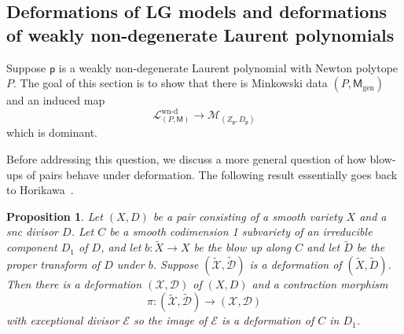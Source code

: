 \documentclass[10pt]{amsart}
\numberwithin{equation}{section}
\theoremstyle{plain}
\newtheorem{proposition}[theorem]{Proposition}
\theoremstyle{definition}
\theoremstyle{remark}
\DeclareMathOperator{\gen}{gen}
\begin{document}
\subsection{Deformations of LG models and deformations of weakly non-degenerate Laurent polynomials}\label{subsection:LG-deformations}

Suppose \(\mathsf{p}\) is a weakly non-degenerate Laurent polynomial with Newton polytope \(P\). The goal of this section is to show that there is Minkowski data \((P,\mathsf{M}_{\gen})\) and an induced map
\[
  \mathcal{L}^{\text{wn-d}}_{(P,\mathsf{M})}\rightarrow \mathcal{M}_{(Z_\mathsf{p},D_\mathsf{p})}
\]
which is dominant.

Before addressing this question, we discuss a more general question of how blow-ups of pairs behave under deformation. The following result essentially goes back to Horikawa~\cite[Theorem 9.1]{horikawa1976deformations}.

\begin{proposition}\label{proposition:defblow}
  Let \((X,D)\) be a pair consisting of a smooth variety \(X\) and a snc divisor \(D\). Let \(C\) be a smooth codimension 1 subvariety of an irreducible component \(D_1\) of \(D\), and let \(b : \widetilde{X}\rightarrow X\) be the blow up along \(C\) and let \(\widetilde{D}\) be the proper transform of \(D\) under \(b\). Suppose \((\widetilde{\mathscr{X}},\widetilde{\mathscr{D}})\) is a deformation of \((\widetilde{X},\widetilde{D})\). Then there is a deformation \((\mathscr{X},\mathscr{D})\) of \((X,D)\) and a contraction morphism
  \[
    \pi \colon (\widetilde{\mathscr{X}},\widetilde{\mathscr{D}}) \rightarrow (\mathscr{X},\mathscr{D})
  \]
  with exceptional divisor \(\mathscr{E}\) so the image of \(\mathscr{E}\) is a deformation of \(C\) in \(D_1\).
\end{proposition}
\end{document}
